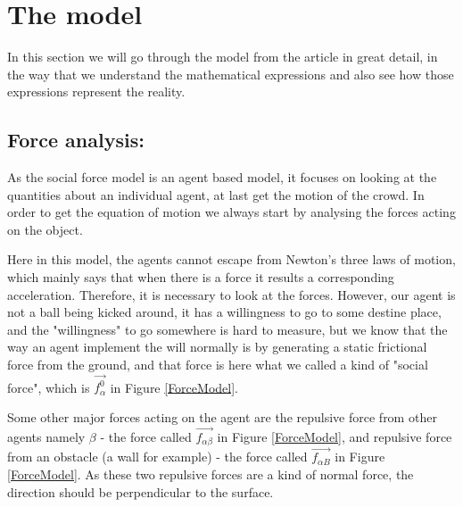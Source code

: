 \section{The model}
\label{sec:the-model}
In this section we will go through the model from the article \cite{self-org} in 
great detail, in the way that we understand the mathematical expressions and also 
see how those expressions represent the reality.\\

\subsection{Force analysis:} 
As the social force model is an agent based model, it focuses on looking at the 
quantities about an individual agent, at last get the motion of the crowd. In order 
to get the equation of motion we always start by analysing the forces acting on the object.

Here in this model, the agents cannot escape from Newton's three laws of motion, 
which mainly says that when there is a force it results a corresponding acceleration.  
Therefore, it is necessary to look at the forces.  However, our agent is not a ball 
being kicked around, it has a willingness to go to some destine place, and the 
"willingness" to go somewhere is hard to measure, but we know that the way an agent 
implement the will normally is by generating a static frictional force from the ground, 
and that force is here what we called a kind of "social force", which is 
$\vec{f^{0}_{\alpha}}$ in Figure \ref{ForceModel}. 

Some other major forces acting on the agent are the repulsive force from other agents 
namely $ \beta $ - the force called $ \vec{f_{\alpha\beta}} $ in Figure \ref{ForceModel}, 
and repulsive force from an obstacle (a wall for example) - the force called $ \vec{f_{\alpha B}} $ 
in Figure \ref{ForceModel}.  As these two repulsive forces are a kind of normal force, the direction 
should be perpendicular to the surface.

